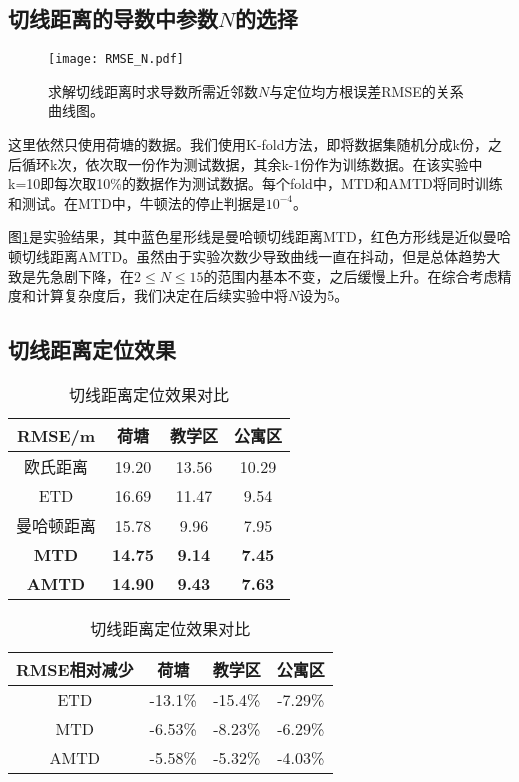 \subsection{切线距离的导数中参数$N$的选择}

\begin{figure}[tb]
	\centering
	\texttt{[image: RMSE\_N.pdf]}
	\caption{求解切线距离时求导数所需近邻数$N$与定位均方根误差RMSE的关系曲线图。}
	\label{fig:rmse_n}
\end{figure}

这里依然只使用荷塘的数据。我们使用K-fold方法，即将数据集随机分成k份，之后循环k次，依次取一份作为测试数据，其余k-1份作为训练数据。在该实验中k=10即每次取10\%的数据作为测试数据。每个fold中，MTD和AMTD将同时训练和测试。在MTD中，牛顿法的停止判据是$10^{-4}$。

图\ref{fig:rmse_n}是实验结果，其中蓝色星形线是曼哈顿切线距离MTD，红色方形线是近似曼哈顿切线距离AMTD。虽然由于实验次数少导致曲线一直在抖动，但是总体趋势大致是先急剧下降，在$2 \le N \le 15$的范围内基本不变，之后缓慢上升。在综合考虑精度和计算复杂度后，我们决定在后续实验中将$N$设为5。

\subsection{切线距离定位效果}

\begin{table}[tbp]
	\caption{切线距离定位效果对比}
	\begin{center}
		\begin{tabular}{cccc}
			\toprule
			RMSE/m &  荷塘 & 教学区 & 公寓区 \\
			\midrule
			欧氏距离 & 19.20 & 13.56 & 10.29 \\
			\midrule
			ETD & 16.69 & 11.47 & 9.54 \\
			\midrule
			曼哈顿距离 & 15.78 & 9.96 & 7.95 \\
			\midrule
			\textbf{MTD} & \textbf{14.75} & \textbf{9.14} & \textbf{7.45} \\
			\midrule
			\textbf{AMTD} & \textbf{14.90} & \textbf{9.43} & \textbf{7.63} \\
			\bottomrule
		\end{tabular}
		\label{tab:td}
	\end{center}
\end{table}

\begin{table}[tbp]
	\caption{切线距离定位效果对比}
	\begin{center}
		\begin{tabular}{cccc}
			\toprule
			RMSE相对减少 &  荷塘 & 教学区 & 公寓区 \\
			\midrule
			ETD & -13.1\% & -15.4\% & -7.29\% \\
			\midrule
			MTD & -6.53\% & -8.23\% & -6.29\% \\
			\midrule
			AMTD & -5.58\% & -5.32\% & -4.03\% \\
			\bottomrule
		\end{tabular}
		\label{tab:td_relative}
	\end{center}
\end{table}

